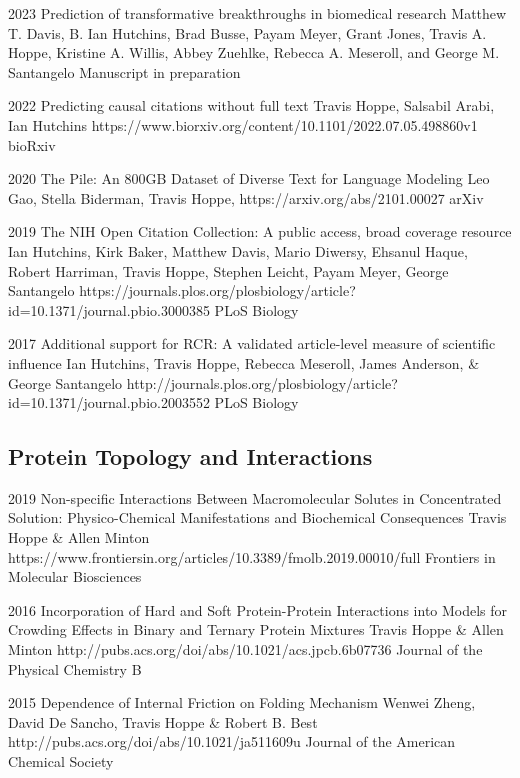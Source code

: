 \documentclass[]{scrartcl}
\begin{document}
\begin{cleanCV}
\Paper
{2023}
{Prediction of transformative breakthroughs in biomedical research}
{Matthew T. Davis, B. Ian Hutchins, Brad Busse, Payam Meyer, Grant Jones, Travis A. Hoppe, Kristine A. Willis, Abbey Zuehlke, Rebecca A. Meseroll, and George M. Santangelo}
{}{Manuscript in preparation}


\Paper
{2022}
{Predicting causal citations without full text}
{Travis Hoppe, Salsabil Arabi, Ian Hutchins}
{https://www.biorxiv.org/content/10.1101/2022.07.05.498860v1}
{bioRxiv}

\Paper
{2020}
{The Pile: An 800GB Dataset of Diverse Text for Language Modeling}
{Leo Gao, Stella Biderman, Travis Hoppe, \etal}
{https://arxiv.org/abs/2101.00027}
{arXiv}

\Paper
{2019}
{The NIH Open Citation Collection: A public access, broad coverage resource}
{Ian Hutchins, Kirk Baker, Matthew Davis, Mario Diwersy, Ehsanul Haque, Robert Harriman, Travis Hoppe, Stephen Leicht, Payam Meyer, George Santangelo}
{https://journals.plos.org/plosbiology/article?id=10.1371/journal.pbio.3000385}
{PLoS Biology}


\Paper
{2017}
{Additional support for RCR: A validated article-level measure of scientific influence}
{Ian Hutchins, Travis Hoppe, Rebecca Meseroll, James Anderson, \& George Santangelo}
{http://journals.plos.org/plosbiology/article?id=10.1371/journal.pbio.2003552}
{PLoS Biology}


\subsection{Protein Topology and Interactions}

\Paper
{2019}
{Non-specific Interactions Between Macromolecular Solutes in Concentrated Solution: Physico-Chemical Manifestations and Biochemical Consequences}
{Travis Hoppe \& Allen Minton}
{https://www.frontiersin.org/articles/10.3389/fmolb.2019.00010/full}
{Frontiers in Molecular Biosciences}


\Paper
{2016}
{Incorporation of Hard and Soft Protein-Protein Interactions into Models for Crowding Effects in Binary and Ternary Protein Mixtures}
{Travis Hoppe \& Allen Minton}
{http://pubs.acs.org/doi/abs/10.1021/acs.jpcb.6b07736}
{Journal of the Physical Chemistry B}

\Paper
{2015}
{Dependence of Internal Friction on Folding Mechanism}
{Wenwei Zheng, David De Sancho, Travis Hoppe \& Robert B. Best}
{http://pubs.acs.org/doi/abs/10.1021/ja511609u}
{Journal of the American Chemical Society}


\end{cleanCV}
\end{document}
